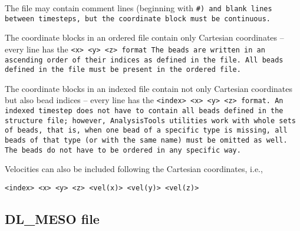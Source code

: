 The \vcf file may contain comment lines (beginning with
\tt{\#}) and blank lines between timesteps, but the coordinate block
must be continuous.

The coordinate blocks in an ordered \vcf file contain only Cartesian
coordinates -- every line has the \tt{<x> <y> <z>} format The beads are
written in an ascending order of their indices as defined in the \vsf file.
All beads defined in the \vsf file must be present in the ordered \vcf
file.

The coordinate blocks in an indexed \vcf file contain not only Cartesian
coordinates but also bead indices -- every line has the \tt{<index> <x> <y>
<z>} format. An indexed timestep does not have to contain all beads defined
in the \vsf structure file; however, \tt{AnalysisTools} utilities work with
whole sets of beads, that is, when one bead of a specific type is missing,
all beads of that type (or with the same name) must be omitted as well.
The beads do not have to be ordered in any specific way.

Velocities can also be included following the Cartesian coordinates, i.e.,
\begin{lstlisting}
<index> <x> <y> <z> <vel(x)> <vel(y)> <vel(z)>
\end{lstlisting}

\subsection{DL\_MESO \field file} %

